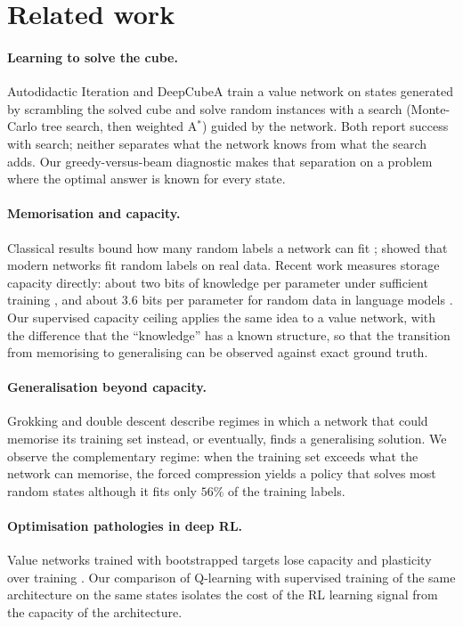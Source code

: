 \documentclass[11pt]{article}
\begin{document}
\section{Related work}

\paragraph{Learning to solve the cube.}
Autodidactic Iteration \citep{mcaleer2018} and DeepCubeA \citep{agostinelli2019} train a value
network on states generated by scrambling the solved cube and solve random instances with a
search (Monte-Carlo tree search, then weighted A$^*$) guided by the network. Both report
success with search; neither separates what the network knows from what the search adds. Our
greedy-versus-beam diagnostic makes that separation on a problem where the optimal answer is
known for every state.

\paragraph{Memorisation and capacity.}
Classical results bound how many random labels a network can fit \citep{cover1965,baum1988};
\citet{zhang2017} showed that modern networks fit random labels on real data. Recent work
measures storage capacity directly: about two bits of knowledge per parameter under
sufficient training \citep{allenzhu2024}, and about $3.6$ bits per parameter for random data in
language models \citep{morris2025}. Our supervised capacity ceiling applies the same idea to a
value network, with the difference that the ``knowledge'' has a known structure, so that the
transition from memorising to generalising can be observed against exact ground truth.

\paragraph{Generalisation beyond capacity.}
Grokking \citep{power2022} and double descent \citep{nakkiran2020} describe regimes in which a
network that could memorise its training set instead, or eventually, finds a generalising
solution. We observe the complementary regime: when the training set exceeds what the network
can memorise, the forced compression yields a policy that solves most random states although
it fits only $56\%$ of the training labels.

\paragraph{Optimisation pathologies in deep RL.}
Value networks trained with bootstrapped targets lose capacity and plasticity over
training \citep{lyle2022,nikishin2022,sokar2023}. Our comparison of Q-learning with supervised
training of the same architecture on the same states isolates the cost of the RL learning
signal from the capacity of the architecture.
\end{document}
